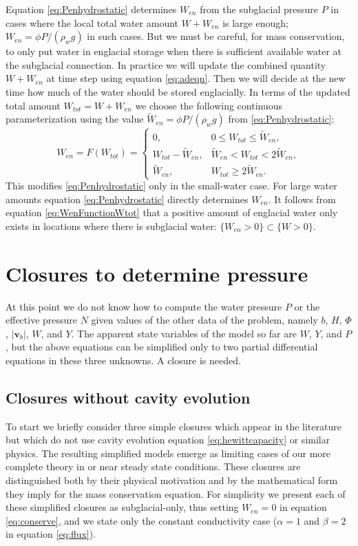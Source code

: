 \documentclass[11pt,final]{amsart}
\newcommand\bv{\mathbf{v}}
\begin{document}
Equation \eqref{eq:Penhydrostatic} determines $W_{en}$ from the subglacial pressure $P$ in cases where the local total water amount $W+W_{en}$ is large enough; $W_{en} = \phi P / (\rho_w g)$ in such cases.  But we must be careful, for mass conservation, to only put water in englacial storage when there is sufficient available water at the subglacial connection.  In practice we will update the combined quantity $W+W_{en}$ at time step using equation \eqref{eq:adeqn}.  Then we will decide at the new time how much of the water should be stored englacially.  In terms of the updated total amount $W_{tot}=W+W_{en}$ we choose the following continuous parameterization using the value $\tilde W_{en} = \phi P / (\rho_w g)$ from \eqref{eq:Penhydrostatic}:
\begin{equation}
W_{en} = F(W_{tot}) = \begin{cases}
             0,                       & 0 \le W_{tot} \le \tilde W_{en}, \\
             W_{tot} - \tilde W_{en}, & \tilde W_{en} < W_{tot} < 2 \tilde W_{en}, \\
             \tilde W_{en},           & W_{tot} \ge 2 \tilde W_{en}. \end{cases}
    \label{eq:WenFunctionWtot}
\end{equation}
This modifies \eqref{eq:Penhydrostatic} only in the small-water case.  For large water amounts equation \eqref{eq:Penhydrostatic} directly determines $W_{en}$.  It follows from equation \eqref{eq:WenFunctionWtot} that a positive amount of englacial water only exists in locations where there is subglacial water: $\{W_{en}>0\} \subset \{W>0\}$.


\section{Closures to determine pressure} \label{sec:closures}

At this point we do not know how to compute the water pressure $P$ or the effective pressure $N$ given values of the other data of the problem, namely $b$, $H$, $\Phi$, $|\bv_b|$, $W$, and $Y$.  The apparent state variables of the model so far are $W$, $Y$, and $P$, but the above equations can be simplified only to two partial differential equations in these three unknowns.   A closure is needed.

\subsection*{Closures without cavity evolution}  To start we briefly consider three simple closures which appear in the literature but which do not use cavity evolution equation \eqref{eq:hewittcapacity} or similar physics.  The resulting simplified models emerge as limiting cases of our more complete theory in or near steady state conditions.  These closures are distinguished both by their physical motivation and by the mathematical form they imply for the mass conservation equation.  For simplicity we present each of these simplified closures as subglacial-only, thus setting $W_{en}=0$ in equation \eqref{eq:conserve}, and we state only the constant conductivity case ($\alpha=1$ and $\beta=2$ in equation \eqref{eq:flux}).
\end{document}
